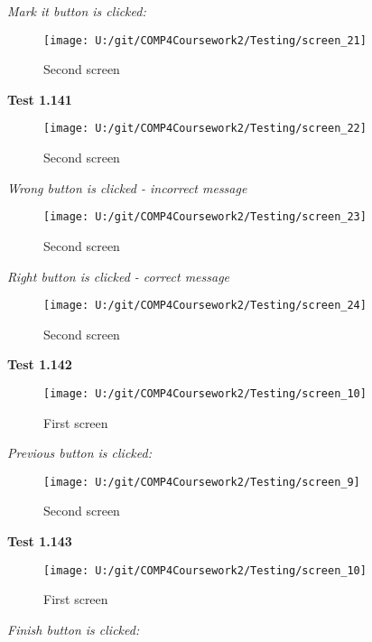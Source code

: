 \textit{Mark it button is clicked: }

\begin{figure}[H]
    \label{fig: Second Screen}\caption{Second screen}
    \texttt{[image: U:/git/COMP4Coursework2/Testing/screen\_21]}
\end{figure}

\textbf{Test 1.141}

\begin{figure}[H]
    \label{fig: Second Screen}\caption{Second screen}
    \texttt{[image: U:/git/COMP4Coursework2/Testing/screen\_22]}
\end{figure}

\textit{Wrong button is clicked - incorrect message}

\begin{figure}[H]
    \label{fig: Second Screen}\caption{Second screen}
    \texttt{[image: U:/git/COMP4Coursework2/Testing/screen\_23]}
\end{figure}

\textit{Right button is clicked - correct message}

\begin{figure}[H]
    \label{fig: Second Screen}\caption{Second screen}
    \texttt{[image: U:/git/COMP4Coursework2/Testing/screen\_24]}
\end{figure}

\textbf{Test 1.142}

\begin{figure}[H]
    \label{fig: First Screen}\caption{First screen}
    \texttt{[image: U:/git/COMP4Coursework2/Testing/screen\_10]}
\end{figure}

\textit{Previous button is clicked: }

\begin{figure}[H]
    \label{fig: Second Screen}\caption{Second screen}
    \texttt{[image: U:/git/COMP4Coursework2/Testing/screen\_9]}
\end{figure}

\textbf{Test 1.143}

\begin{figure}[H]
    \label{fig: First Screen}\caption{First screen}
    \texttt{[image: U:/git/COMP4Coursework2/Testing/screen\_10]}
\end{figure}

\textit{Finish button is clicked: }

